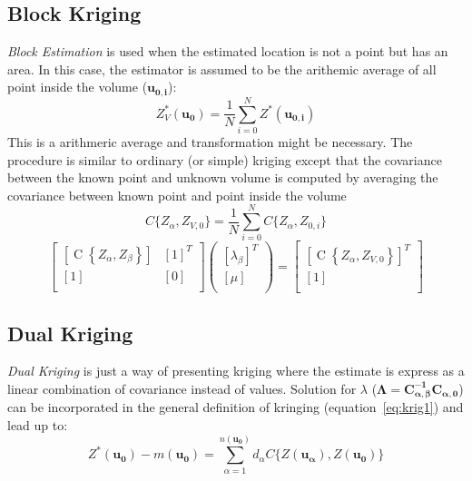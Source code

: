 \documentclass[twocolumn]{article}
\numberwithin{equation}{section}
\begin{document}
\subsection{Block Kriging} 
\emph{Block Estimation} is used when the estimated location is not a point but has an area. In this case, the estimator is assumed to be the arithemic average of all point inside the volume ($\boldsymbol{u_{0,i}}$):
\[ Z_V^*( \boldsymbol{u_{0}}) = \frac{1}{N} \sum_{i=0}^N Z^*(\boldsymbol{u_{0,i}})\]
This is a arithmeric average and transformation might be necessary. The procedure is similar to ordinary (or simple) kriging except that the covariance between the known point and unknown volume is computed by averaging the covariance between known point and point inside the volume
\[ C\{Z_{\alpha},Z_{V,0}\}  = \frac{1}{N} \sum_{i=0}^N  C\{Z_{\alpha}, Z_{0,i}\} \]
\begin{equation}
		\begin{bmatrix}
       		[\operatorname{C}\left\{Z_\alpha,Z_\beta\right\}]	& [1]^T	\\
       		[1]							& [0	]						\\
     	\end{bmatrix} 
     	\begin{pmatrix}
       		[\lambda_\beta]^T 	\\
       		[\mu] 		\\
     	\end{pmatrix}
     	=
     	\begin{bmatrix}
       		[\operatorname{C}\left\{Z_\alpha,Z_{V,0}\right\}]^T 	\\
       		[1]					\\
     	\end{bmatrix}
\end{equation}


\subsection{Dual Kriging}
\emph{Dual Kriging} is just a way of presenting kriging where the estimate is express as a linear combination of covariance instead of values. Solution for $\lambda$  ($\boldsymbol{\Lambda} = \boldsymbol{C_{\alpha,\beta}^{-1}} \boldsymbol{C_{\alpha,0}} $) can be incorporated in the general definition of kringing (equation~\ref{eq:krig1}) and lead up to:
\begin{equation} \label{eq:dualkrig}
		Z^* (\boldsymbol{u_0}) -m(\boldsymbol{u_0}) =  \sum_{\alpha=1}^{n(\boldsymbol{u_0})} d_\alpha C\{Z(\boldsymbol{u_\alpha}),Z(\boldsymbol{u_0})  \}
\end{equation}
\end{document}

